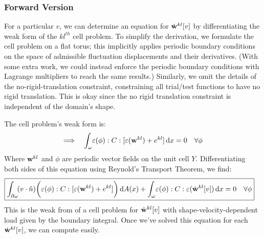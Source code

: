 \documentclass[10pt]{article}
\providecommand{\vint}[3][x]{\int_{#2} \! #3 \, \mathrm{d}#1}
\providecommand{\sint}[3][x]{\int_{#2} \! #3 \, \mathrm{d}A(#1)}
\renewcommand{\vec}[1]{{\bf #1}}
\newcommand\pr[1]{\prettyref{#1}}
\def\normal{\hat{n}}
\def\w{\vec{w}}
\def\strain{\varepsilon}
\begin{document}
\subsubsection{Forward Version}
For a particular $v$, we can determine an equation for $\dot{\w}^{kl}[v]$ by
differentiating the weak form of the $kl^{th}$ cell problem.
To simplify the derivation, we formulate the cell problem on a flat torus; this
implicitly applies periodic boundary conditions on the space of admissible
fluctuation displacements and their derivatives. (With some extra work, we
could instead enforce the periodic boundary conditions with Lagrange
multipliers to reach the same results.)
Similarly, we omit the details of the
no-rigid-translation constraint, constraining all trial/test
functions to have no rigid translation. This is okay since the no rigid
translation constraint is independent of the domain's shape.

The cell problem's weak form is:
\begin{equation}
\label{eqn:weak_cell}
    \Longrightarrow \quad
    \vint{\omega}{\strain(\phi) : C : [\strain(\w^{kl}) + e^{kl}]}
    = 0
    \quad \forall \phi \\
\end{equation}
Where $\w^{kl}$ and $\phi$ are periodic vector fields on the unit cell $Y$.
Differentiating both sides of this equation using Reynold's Transport Theorem,
we find:
\begin{align}
\label{eqn:weak_forward}
\Aboxed{
\sint{\partial \omega}{(v \cdot \normal) \bigg( \strain(\phi) : C : [\strain(\w^{kl}) + e^{kl}]\bigg)}
+ \vint{\omega}{\strain(\phi) : C : \strain(\dot \w^{kl}[v])}
&= 0 \quad \forall \phi
}
\end{align}
This is the weak from of a cell problem for $\dot \w^{kl}[v]$ with
shape-velocity-dependent load given by the boundary integral. Once we've solved
this equation for each $\dot \w^{kl}[v]$, we can compute
\pr{eq:generic_shape_derivative} easily.
\end{document}
